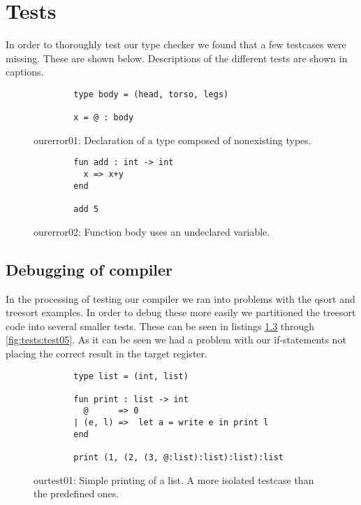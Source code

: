 \chapter{Tests}
In order to thoroughly test our type checker we found that a few testcases
were missing. These are shown below. Descriptions of the different tests are
shown in captions.

\begin{figure}
    \centering
    \begin{lstlisting}
        type body = (head, torso, legs)

        x = @ : body
    \end{lstlisting}
    \label{fig:tests:error01}
    \caption{ourerror01: Declaration of a type composed of nonexisting types.}
\end{figure}

\begin{figure}
    \centering
    \begin{lstlisting}
        fun add : int -> int
          x => x+y
        end

        add 5
    \end{lstlisting}
    \label{fig:tests:error02}
    \caption{ourerror02: Function body uses an undeclared variable.}
\end{figure}


\section{Debugging of compiler}
In the processing of testing our compiler we ran into problems with the qsort
and treesort examples. In order to debug these more easily we partitioned the
treesort code into several smaller tests. These can be seen in listings
\ref{fig:tests:test01} through \ref{fig:tests:test05}. As it can be seen we
had a problem with our if-statements not placing the correct result in the
target register.

\begin{figure}
    \centering
    \begin{lstlisting}
        type list = (int, list)

        fun print : list -> int
          @      => 0
        | (e, l) =>  let a = write e in print l
        end

        print (1, (2, (3, @:list):list):list):list
    \end{lstlisting}
    \label{fig:tests:test01}
    \caption{ourtest01: Simple printing of a list. A more isolated testcase 
             than the predefined ones.}
\end{figure}

